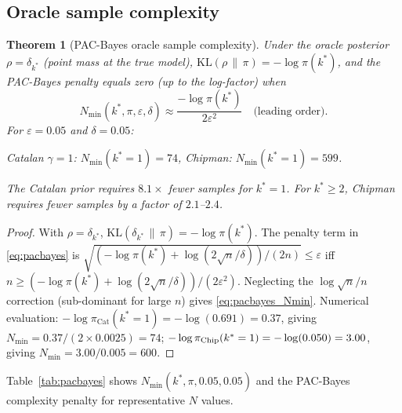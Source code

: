 \documentclass[ba]{imsart}
\theoremstyle{plain}
\newtheorem{theorem}{Theorem}[section]
\theoremstyle{definition}
\theoremstyle{remark}
\newcommand{\kl}{\mathrm{KL}}
\newcommand{\Nmin}{N_{\min}}
\newcommand{\Cat}{\mathrm{Cat}}
\begin{document}
\subsection{Oracle sample complexity}

\begin{theorem}[PAC-Bayes oracle sample complexity]\label{thm:pacbayes}
  Under the oracle posterior $\rho = \delta_{k^*}$ (point mass at the true model),
  $\kl(\rho\,\|\,\pi) = -\log\pi(k^*)$, and the PAC-Bayes penalty equals zero
  (up to the log-factor) when
  \begin{equation}
    \Nmin(k^*,\pi,\varepsilon,\delta) \approx
    \frac{-\log\pi(k^*)}{2\varepsilon^2}
    \quad\text{(leading order)}.
    \label{eq:pacbayes_Nmin}
  \end{equation}
  For $\varepsilon = 0.05$ and $\delta=0.05$:
  \begin{center}
    \emph{Catalan $\gamma=1$:} $\Nmin(k^*=1) = 74$,
    \quad
    \emph{Chipman:} $\Nmin(k^*=1) = 599$.
  \end{center}
  The Catalan prior requires $\mathbf{8.1\times}$ fewer samples for $k^*=1$.
  For $k^* \geq 2$, Chipman requires fewer samples by a factor of $2.1$--$2.4$.
\end{theorem}

\begin{proof}
  With $\rho=\delta_{k^*}$, $\kl(\delta_{k^*}\,\|\,\pi) = -\log\pi(k^*)$.
  The penalty term in \eqref{eq:pacbayes} is
  $\sqrt{(-\log\pi(k^*) + \log(2\sqrt{n}/\delta))/(2n)} \leq \varepsilon$
  iff $n \geq (-\log\pi(k^*)+\log(2\sqrt{n}/\delta))/(2\varepsilon^2)$.
  Neglecting the $\log\sqrt{n}/n$ correction (sub-dominant for large $n$)
  gives \eqref{eq:pacbayes_Nmin}.
  Numerical evaluation: $-\log\pi_{\Cat}(k^*=1) = -\log(0.691)=0.37$,
  giving $\Nmin=0.37/(2\times 0.0025)=74$;
  $-\log\pi_{\rm Chip}(k^*=1) = -\log(0.050)=3.00$, giving
  $\Nmin=3.00/0.005=600$.
\end{proof}

Table~\ref{tab:pacbayes} shows $\Nmin(k^*, \pi, 0.05, 0.05)$ and the
PAC-Bayes complexity penalty for representative $N$ values.
\end{document}
